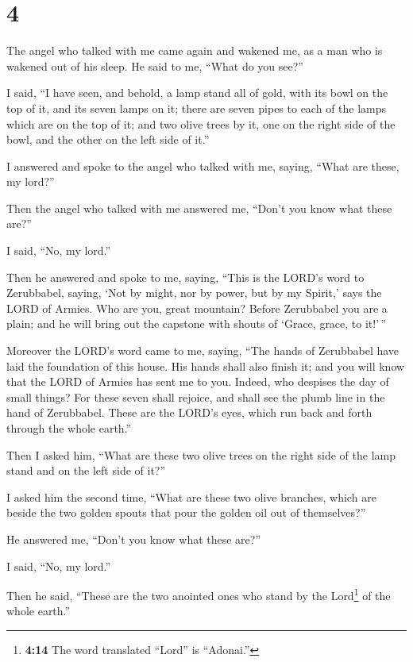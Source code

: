 \hypertarget{section-3}{%
\section{4}\label{section-3}}

 The angel who talked with me came again and wakened me,
as a man who is wakened out of his sleep.  He said to me,
``What do you see?''

I said, ``I have seen, and behold, a lamp stand all of gold, with its
bowl on the top of it, and its seven lamps on it; there are seven pipes
to each of the lamps which are on the top of it;  and two
olive trees by it, one on the right side of the bowl, and the other on
the left side of it.''

 I answered and spoke to the angel who talked with me,
saying, ``What are these, my lord?''

 Then the angel who talked with me answered me, ``Don't
you know what these are?''

I said, ``No, my lord.''

 Then he answered and spoke to me, saying, ``This is the
LORD's word to Zerubbabel, saying, `Not by might, nor by power, but by
my Spirit,' says the LORD of Armies.  Who are you, great
mountain? Before Zerubbabel you are a plain; and he will bring out the
capstone with shouts of `Grace, grace, to it!'\,''

 Moreover the LORD's word came to me, saying,
 ``The hands of Zerubbabel have laid the foundation of
this house. His hands shall also finish it; and you will know that the
LORD of Armies has sent me to you.  Indeed, who despises
the day of small things? For these seven shall rejoice, and shall see
the plumb line in the hand of Zerubbabel. These are the LORD's eyes,
which run back and forth through the whole earth.''

 Then I asked him, ``What are these two olive trees on
the right side of the lamp stand and on the left side of it?''

 I asked him the second time, ``What are these two olive
branches, which are beside the two golden spouts that pour the golden
oil out of themselves?''

 He answered me, ``Don't you know what these are?''

I said, ``No, my lord.''

 Then he said, ``These are the two anointed ones who
stand by the Lord\footnote{\textbf{4:14} The word translated ``Lord'' is
  ``Adonai.''} of the whole earth.''

